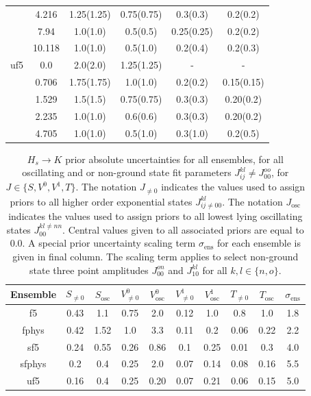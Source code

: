 \begin{table}[]
\begin{tabular}{c c | c c c c}
           & 4.216  & 1.25(1.25) & 0.75(0.75) & 0.3(0.3)   & 0.2(0.2) \\
           & 7.94   & 1.0(1.0)   & 0.5(0.5)   & 0.25(0.25) & 0.2(0.2) \\
           & 10.118 & 1.0(1.0)   & 0.5(1.0)   & 0.2(0.4)   & 0.2(0.3)\\
    \hline
    uf5 & 0.0   & 2.0(2.0)   & 1.25(1.25) & -        & - \\
        & 0.706 & 1.75(1.75) & 1.0(1.0)   & 0.2(0.2) & 0.15(0.15)\\ 
        & 1.529 & 1.5(1.5)   & 0.75(0.75) & 0.3(0.3) & 0.20(0.2) \\
        & 2.235 & 1.0(1.0)   & 0.6(0.6)   & 0.3(0.3) & 0.20(0.2) \\
        & 4.705 & 1.0(1.0)   & 0.5(1.0)   & 0.3(1.0) & 0.2(0.5)\\
    \hline
    \hline
    \end{tabular}
\end{table}


\begin{table}
  \caption{$H_s\rightarrow K$ prior absolute uncertainties for all ensembles, for all oscillating and or non-ground state fit parameters $J_{ij}^{kl} \neq J_{00}^{oo}$, for $J\in \{S,V^0,V^1,T\}$.  The notation $J_{\neq0}$ indicates the values used to assign priors to all higher order exponential states $J_{ij\neq00}^{kl}$. The notation $J_{\mathrm{osc}}$ indicates the values used to assign priors to all lowest lying oscillating states $J_{00}^{kl\neq nn}$. Central values given to all associated priors are equal to 0.0. A special prior uncertainty scaling term $\sigma_\mathrm{ens}$ for each ensemble is given in final column.  The scaling term applies to select non-ground state three point amplitudes $J_{00}^{on}$ and $J_{10}^{kl}$ for all $k,l \in \{n,o\}$.}
  \begin{center} 
    \begin{tabular}{c c c c c c c c c c}
    \hline
    \hline
    Ensemble & $S_{\neq 0}$ & $S_{\mathrm{osc}}$ & $V^0_{\neq 0}$ & $V^0_{\mathrm{osc}}$ & $V^1_{\neq 0}$ & $V^1_{\mathrm{osc}}$ & $T_{\neq 0}$ & $T_{\mathrm{osc}}$ & $\sigma_\mathrm{ens}$\\
    \hline
    \hline
    f5 & 0.43 & 1.1 & 0.75 & 2.0 & 0.12 & 1.0 & 0.8 & 1.0 & 1.8\\
    fphys & 0.42 & 1.52 & 1.0 & 3.3 & 0.11 & 0.2 & 0.06 & 0.22 & 2.2\\
    sf5 & 0.24 & 0.55 & 0.26 & 0.86 & 0.1 & 0.25 & 0.01 & 0.3 & 4.0\\
    sfphys & 0.2 & 0.4 & 0.25 & 2.0 & 0.07 & 0.14 & 0.08 & 0.16 & 5.5\\
    uf5 & 0.16 & 0.4 & 0.25 & 0.20 & 0.07 & 0.21 & 0.06 & 0.15 & 5.0\\
    \hline
    \hline
    \end{tabular}
    \end{center}
  \label{tab:3pt_pesky_priors_HsK}
\end{table}

